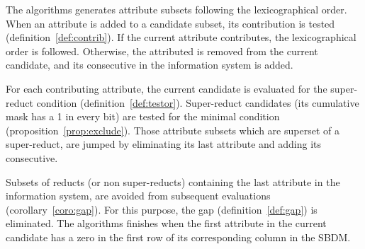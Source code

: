\documentclass[authoryear,preprint,review,12pt]{elsarticle}
\begin{document}
	The algorithms generates attribute subsets following the lexicographical order. When an attribute is added to a candidate subset, its contribution is tested (definition~\ref{def:contrib}). If the current attribute contributes, the lexicographical order is followed. Otherwise, the attributed is removed from the current candidate, and its consecutive in the information system is added. 
	
	For each contributing attribute, the current candidate is evaluated for the super-reduct condition (definition~\ref{def:testor}). Super-reduct candidates (its cumulative mask has a 1 in every bit) are tested for the minimal condition (proposition~\ref{prop:exclude}). Those attribute subsets which are superset of a super-reduct, are jumped by eliminating its last attribute and adding its consecutive.
	
	Subsets of reducts (or non super-reducts) containing the last attribute in the information system, are avoided from subsequent evaluations (corollary~\ref{coro:gap}). For this purpose, the gap (definition~\ref{def:gap}) is eliminated. The algorithms finishes when the first attribute in the current candidate has a zero in the first row of its corresponding column in the SBDM.
\end{document}
